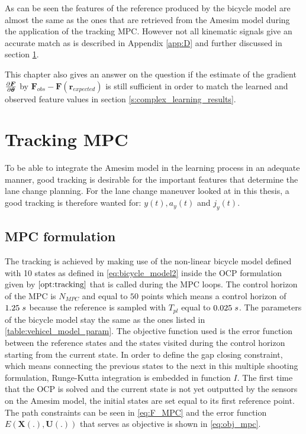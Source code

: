 As can be seen the features of the reference produced by the bicycle model are almost the same as the ones that are retrieved from the Amesim model during the application of the tracking MPC. However not all kinematic signals give an accurate match as is described in Appendix \ref{app:D} and further discussed in section \ref{s:tracking_mpc}. 

This chapter also gives an answer on the question if the estimate of the gradient $\pdv{\bm{F}}{\bm{\theta}}$ by $ \bm{F}_{obs} - \bm{F}(\bm{r}_{expected})$ is still sufficient in order to match the learned and observed feature values in section \ref{s:complex_learning_results}.\\

\section{Tracking MPC} 
\label{s:tracking_mpc}
To be able to integrate the Amesim model in the learning process in an adequate manner, good tracking is desirable for the important features that determine the lane change planning. For the lane change maneuver looked at in this thesis, a good tracking is therefore wanted for: $y(t), a_y(t)$ and $j_y(t)$.

\subsection{MPC formulation}
The tracking is achieved by making use of the non-linear bicycle model defined with 10 states as defined in \ref{eq:bicycle_model2} inside the OCP formulation given by $\ref{opt:tracking}$ that is called during the MPC loops. The control horizon of the MPC is $N_{MPC}$ and equal to $50$ points which means a control horizon of $1.25 \hspace{1mm}s$ because the reference is sampled with $T_{pl}$ equal to $0.025\hspace{1mm}s$. The parameters of the bicycle model stay the same as the ones listed in \ref{table:vehicel_model_param}. The objective function used is the error function between the reference states and the states visited during the control horizon starting from the current state. In order to define the gap closing constraint, which means connecting the previous states to the next in this multiple shooting formulation, Runge-Kutta integration is embedded in function $I$.  
The first time that the OCP is solved and the current state is not yet outputted by the sensors on the Amesim model, the initial states are set equal to its first reference point. The path constraints can be seen in \ref{eq:F_MPC} and the error function $E(\bm{X}(.),\bm{U}(.))$ that serves as objective is shown in \ref{eq:obj_mpc}.


